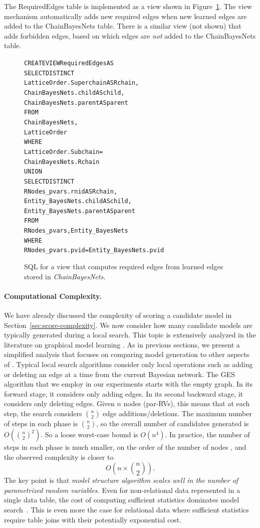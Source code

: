  The RequiredEdges table is implemented as a view shown in Figure~\ref{fig:required-edges}. The view mechanism automatically adds new required edges when new learned edges are added to the ChainBayesNets table. There is a similar view (not shown) that adds forbidden edges, based on which edges are    \emph{not} added to the ChainBayesNets table.
 

\begin{figure}
\begin{alltt}
CREATE VIEW RequiredEdges AS
	SELECT DISTINCT
        LatticeOrder.Superchain AS Rchain,
        ChainBayesNets.child AS child,
        ChainBayesNets.parent AS parent
	FROM
        ChainBayesNets,
        LatticeOrder
	WHERE
       LatticeOrder.Subchain = 
       ChainBayesNets.Rchain
UNION
       SELECT DISTINCT
        RNodes\_pvars.rnid AS Rchain,
        Entity\_BayesNets.child AS child,
        Entity\_BayesNets.parent AS parent	
        FROM
        RNodes\_pvars, Entity\_BayesNets
        WHERE
        RNodes\_pvars.pvid = Entity\_BayesNets.pvid
  \end{alltt}
  \caption{SQL for a view that computes required edges from learned edges stored in \it{ChainBayesNets}.}
  \label{fig:required-edges}
 \end{figure}

\paragraph{Computational Complexity.} We have already discussed the complexity of scoring a candidate model in Section~\ref{sec:score-complexity}. We now consider how many candidate  models are typically generated during a local search. This topic is extensively analyzed in the literature on graphical model learning \cite{Chickering2003}. As in previous sections, we present a simplified analysis that focuses on comparing model generation to other aspects of \FB. Typical local search algorithms consider only local operations such as adding or deleting an edge at a time from the current Bayesian network. The GES algorithm that we employ in our experiments starts with the empty graph. In its forward stage, it considers only adding edges. In its second backward stage, it considers only deleting edges. Given $n$ nodes (par-RVs), this means that at each step, the search considers $n\choose2$ edge additions/deletions. The maximum number of steps in each phase is $n\choose2$, so the overall number of candidates generated is $O({n\choose2}^{2}).$ So a loose worst-case bound is $O(n^{4})$. In practice, the number of steps in each phase is much smaller, on the order of the number of nodes \cite{Schulte2012}, and the observed complexity is closer to $$O(n\times {n\choose2}).$$ The key point is that {\em model structure algorithm scales well  in the number of parametrized random variables.} Even for non-relational data represented in a single data table, the cost of computing sufficient statistics dominates model search~\cite{Moore1998}. This is even more the case for relational data where sufficient statistics require table joins with their potentially exponential cost. 


